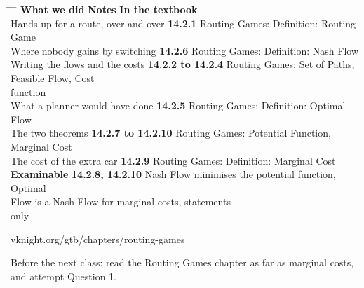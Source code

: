\hspace{0.3cm}
\begin{minipage}{0.95\linewidth}
\begin{tabbing}
\hspace{6.9cm} \= \hspace{3.0cm} \= \hspace{9.4cm} \= \kill
\textbf{What we did} \> {\color{inkteal}\textbf{Notes}} \> \textbf{In the textbook} \>
  \\[0.5em]
Hands up for a route, over and over \> {\color{inkteal}\textbf{14.2.1}} \> Routing Games:
  Definition: Routing Game \> \\[0.45em]
Where nobody gains by switching \> {\color{inkteal}\textbf{14.2.6}} \> Routing Games:
  Definition: Nash Flow \> \\[0.45em]
Writing the flows and the costs \> {\color{inkteal}\textbf{14.2.2 to 14.2.4}} \>
  Routing Games: Set of Paths, Feasible Flow, Cost \> \\
\> \> function \> \\[0.45em]
What a planner would have done \> {\color{inkteal}\textbf{14.2.5}} \> Routing Games:
  Definition: Optimal Flow \> \\[0.45em]
The two theorems \> {\color{inkteal}\textbf{14.2.7 to 14.2.10}} \> Routing Games:
  Potential Function, Marginal Cost \> \\[0.45em]
The cost of the extra car \> {\color{inkteal}\textbf{14.2.9}} \> Routing Games:
  Definition: Marginal Cost \> \\[0.45em]
\textbf{Examinable} \> {\color{inkteal}\textbf{14.2.8, 14.2.10}} \> Nash Flow
  minimises the potential function, Optimal \> \\
\> \> Flow is a Nash Flow for marginal costs, statements \> \\
\> \> only \> 
\end{tabbing}
\end{minipage}

\vspace{0.45cm}

{\color{inkgrey} vknight.org/gtb/chapters/routing-games}

\vspace{0.3cm}

{\large Before the next class: read the Routing Games chapter as far as marginal
  costs, and
  attempt Question 1.}


